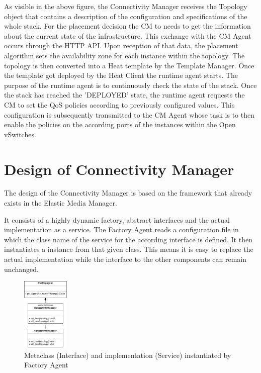 As visible in the above figure, the Connectivity Manager receives the Topology object that contains a description of the configuration and specifications of the whole stack. For the placement decision the CM to needs to get the information about the current state of the infrastructure. This exchange with the CM Agent occurs through the HTTP API. Upon reception of that data, the placement algorithm sets the availability zone for each instance within the topology. The topology is then converted into a Heat template by the Template Manager. Once the template got deployed by the Heat Client the runtime agent starts. The purpose of the runtime agent is to continuously check the state of the stack. Once the stack has reached the 'DEPLOYED' state, the runtime agent requests the CM to set the QoS policies according to previously configured values. This configuration is subsequently transmitted to the CM Agent whose task is to then enable the policies on the according ports of the instances within the Open vSwitches.


\section{Design of Connectivity Manager}

The design of the Connectivity Manager is based on the framework that already exists in the Elastic Media Manager.

It consists of a highly dynamic factory, abstract interfaces and the actual implementation as a service.
The Factory Agent reads a configuration file in which the class name of the service for the according interface is defined. It then instantiates a instance from that given class. This means it is easy to replace the actual implementation while the interface to the other components can remain unchanged.

\begin{figure}[H]
\centering

\includegraphics[width=0.2\textwidth]{images/design/cm-emm_interface_classes}

\caption{Metaclass (Interface) and implementation (Service) instantiated by Factory Agent}
\end{figure}

